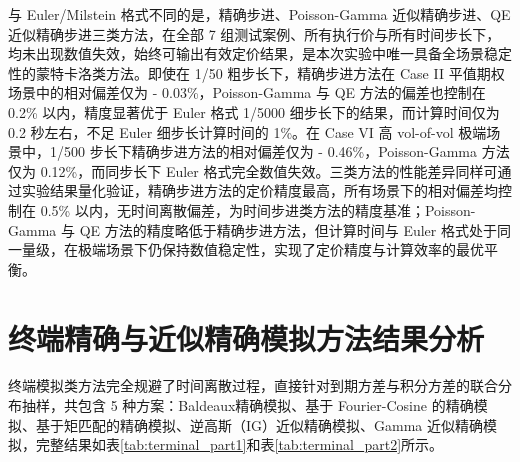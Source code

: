 与 Euler/Milstein 格式不同的是，精确步进、Poisson-Gamma 近似精确步进、QE 近似精确步进三类方法，在全部 7 组测试案例、所有执行价与所有时间步长下，均未出现数值失效，始终可输出有效定价结果，是本次实验中唯一具备全场景稳定性的蒙特卡洛类方法。即使在 1/50 粗步长下，精确步进方法在 Case II 平值期权场景中的相对偏差仅为 - 0.03\%，Poisson-Gamma 与 QE 方法的偏差也控制在 0.2\% 以内，精度显著优于 Euler 格式 1/5000 细步长下的结果，而计算时间仅为 0.2 秒左右，不足 Euler 细步长计算时间的 1\%。在 Case VI 高 vol-of-vol 极端场景中，1/500 步长下精确步进方法的相对偏差仅为 - 0.46\%，Poisson-Gamma 方法仅为 0.12\%，而同步长下 Euler 格式完全数值失效。三类方法的性能差异同样可通过实验结果量化验证，精确步进方法的定价精度最高，所有场景下的相对偏差均控制在 0.5\% 以内，无时间离散偏差，为时间步进类方法的精度基准；Poisson-Gamma 与 QE 方法的精度略低于精确步进方法，但计算时间与 Euler 格式处于同一量级，在极端场景下仍保持数值稳定性，实现了定价精度与计算效率的最优平衡。

\section{终端精确与近似精确模拟方法结果分析}
终端模拟类方法完全规避了时间离散过程，直接针对到期方差与积分方差的联合分布抽样，共包含 5 种方案：Baldeaux精确模拟、基于 Fourier-Cosine 的精确模拟、基于矩匹配的精确模拟、逆高斯（IG）近似精确模拟、Gamma 近似精确模拟，完整结果如表\ref{tab:terminal_part1}和表\ref{tab:terminal_part2}所示。

